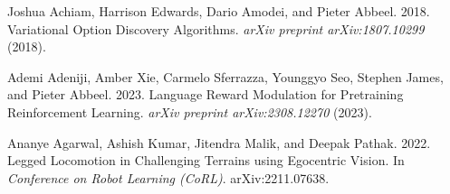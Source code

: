 \documentclass[acmsmall,review,anonymous]{acmart}
\begin{document}

%
%
%
%

\begin{thebibliography}{311}

%
%
%
%
%
%
%
%
%
%
%
%
%
%
%
%

\ifx \showCODEN    \undefined {}     \fi
\ifx \showDOI      \undefined \def \showDOI       #1{#1}\fi
\ifx \showISBNx    \undefined \def \showISBNx     #1{\unskip}     \fi
\ifx \showISBNxiii \undefined \def \showISBNxiii  #1{\unskip}     \fi
\ifx \showISSN     \undefined \def \showISSN      #1{\unskip}     \fi
\ifx \showLCCN     \undefined \def \showLCCN      #1{\unskip}     \fi
\ifx \shownote     \undefined \def \shownote      #1{#1}          \fi
\ifx \showarticletitle \undefined \def \showarticletitle #1{#1}   \fi
\ifx \showURL      \undefined \def \showURL       {\relax}        \fi
%
%
\providecommand\bibfield[2]{#2}
\providecommand\bibinfo[2]{#2}
\providecommand\natexlab[1]{#1}
\providecommand\showeprint[2][]{arXiv:#2}

\bibfield{author}{\bibinfo{person}{Joshua Achiam}, \bibinfo{person}{Harrison
  Edwards}, \bibinfo{person}{Dario Amodei}, {and} \bibinfo{person}{Pieter
  Abbeel}.} \bibinfo{year}{2018}\natexlab{}.
\newblock \showarticletitle{Variational Option Discovery Algorithms}.
\newblock \bibinfo{journal}{\emph{arXiv preprint arXiv:1807.10299}}
  (\bibinfo{year}{2018}).
\newblock


\bibfield{author}{\bibinfo{person}{Ademi Adeniji}, \bibinfo{person}{Amber Xie},
  \bibinfo{person}{Carmelo Sferrazza}, \bibinfo{person}{Younggyo Seo},
  \bibinfo{person}{Stephen James}, {and} \bibinfo{person}{Pieter Abbeel}.}
  \bibinfo{year}{2023}\natexlab{}.
\newblock \showarticletitle{Language Reward Modulation for Pretraining
  Reinforcement Learning}.
\newblock \bibinfo{journal}{\emph{arXiv preprint arXiv:2308.12270}}
  (\bibinfo{year}{2023}).
\newblock


\bibfield{author}{\bibinfo{person}{Ananye Agarwal}, \bibinfo{person}{Ashish
  Kumar}, \bibinfo{person}{Jitendra Malik}, {and} \bibinfo{person}{Deepak
  Pathak}.} \bibinfo{year}{2022}\natexlab{}.
\newblock \showarticletitle{Legged Locomotion in Challenging Terrains using
  Egocentric Vision}. In \bibinfo{booktitle}{\emph{Conference on Robot Learning
  (CoRL)}}.
\newblock
\newblock
\shownote{arXiv:2211.07638}.



\end{thebibliography}
\end{document}
